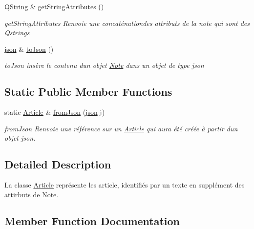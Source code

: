 \begin{DoxyCompactItemize}
Q\+String \& \hyperlink{classArticle_aaddf8d9717ead08fce20be1052af82c9}{get\+String\+Attributes} ()
\begin{DoxyCompactList}\small\item\em get\+String\+Attributes Renvoie une concaténationdes attributs de la note qui sont des Qstrings \end{DoxyCompactList}\item 
\hyperlink{classnlohmann_1_1basic__json}{json} \& \hyperlink{classArticle_af1ca7d2c39aae800610504319526f3e3}{to\+Json} ()
\begin{DoxyCompactList}\small\item\em to\+Json insère le contenu d\textquotesingle{}un objet \hyperlink{classNote}{Note} dans un objet de type json \end{DoxyCompactList}\end{DoxyCompactItemize}
\subsection*{Static Public Member Functions}
\begin{DoxyCompactItemize}
\item 
static \hyperlink{classArticle}{Article} \& \hyperlink{classArticle_a6c17d092d93e155dbd7f8a7fa037ff61}{from\+Json} (\hyperlink{classnlohmann_1_1basic__json}{json} j)
\begin{DoxyCompactList}\small\item\em from\+Json Renvoie une référence sur un \hyperlink{classArticle}{Article} qui aura été créée à partir d\textquotesingle{}un objet json. \end{DoxyCompactList}\end{DoxyCompactItemize}


\subsection{Detailed Description}
La classe \hyperlink{classArticle}{Article} représente les article, identifiés par un texte en supplément des attirbuts de \hyperlink{classNote}{Note}. 

\subsection{Member Function Documentation}
\mbox{\label{classArticle_a63e4e505cdfb8b11a9504ba4e3ba3c29}} 
